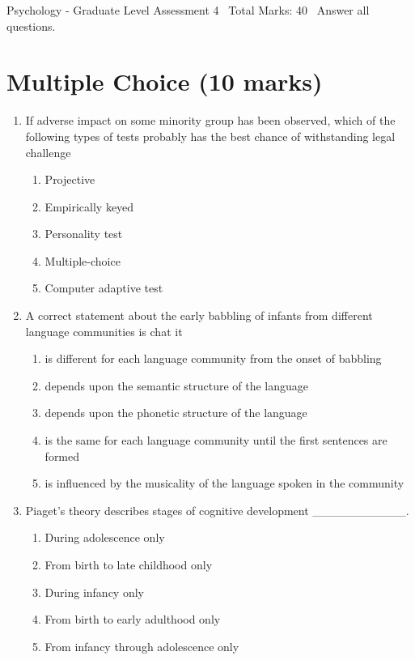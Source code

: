 \documentclass[12pt]{article}
\begin{document}
\begin{center}
Psychology - Graduate Level Assessment 4 \
Total Marks: 40 \
Answer all questions.
\end{center}

\section*{Multiple Choice (10 marks)}
\begin{enumerate}[label=\arabic*.]
\item If adverse impact on some minority group has been observed, which of the following types
of tests probably has the best chance of withstanding legal challenge
\begin{enumerate}[label=(\alph*)]
    \item Projective
    \item Empirically keyed
    \item Personality test
    \item Multiple-choice
    \item Computer adaptive test
\end{enumerate}
\item A correct statement about the early babbling of infants from different language
communities is chat it
\begin{enumerate}[label=(\alph*)]
    \item is different for each language community from the onset of babbling
    \item depends upon the semantic structure of the language
    \item depends upon the phonetic structure of the language
    \item is the same for each language community until the first sentences are formed
    \item is influenced by the musicality of the language spoken in the community
\end{enumerate}
\item Piaget's theory describes stages of cognitive development \_\_\_\_\_\_\_\_\_\_\_.
\begin{enumerate}[label=(\alph*)]
    \item During adolescence only
    \item From birth to late childhood only
    \item During infancy only
    \item From birth to early adulthood only
    \item From infancy through adolescence only

\end{enumerate}
\end{enumerate}
\end{document}
